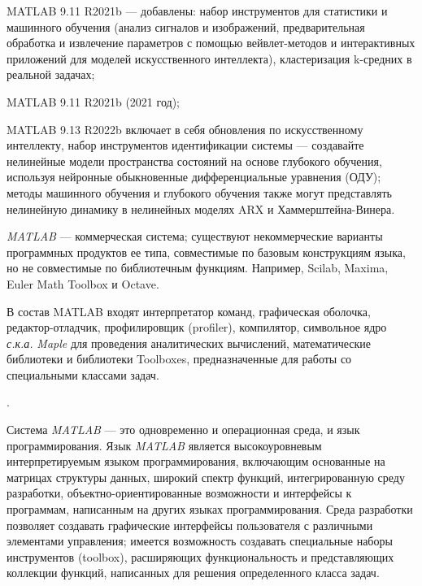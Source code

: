 \begin{textitemize}
	\item MATLAB 9.11 R2021b --- добавлены: набор инструментов для статистики и машинного обучения (анализ сигналов и изображений, предварительная обработка и извлечение параметров с помощью вейвлет-методов и интерактивных приложений для моделей искусственного интеллекта), кластеризация k-средних в реальной задачах; 
	\item MATLAB 9.11 R2021b (2021 год);
	\item MATLAB 9.13 R2022b включает в себя обновления по искусственному интеллекту, набор инструментов идентификации системы --- создавайте нелинейные модели пространства состояний на основе глубокого обучения, используя нейронные обыкновенные дифференциальные уравнения (ОДУ); методы машинного обучения и глубокого обучения также могут представлять нелинейную динамику в нелинейных моделях ARX и Хаммерштейна-Винера.
\end{textitemize}

\textit{MATLAB} --- коммерческая система; существуют некоммерческие варианты программных продуктов ее типа, совместимые по базовым конструкциям языка, но не совместимые по библиотечным функциям. Например, Scilab, Maxima, Euler Math Toolbox и Octave.

В состав MATLAB входят интерпретатор команд, графическая оболочка, редактор-отладчик, профилировщик (profiler), компилятор, символьное ядро \textit{с.к.а.} \textit{Maple} для проведения аналитических вычислений, математические библиотеки и библиотеки Toolboxes, предназначенные для работы со специальными классами задач.

.

Система \textit{MATLAB} --- это одновременно и операционная среда, и язык программирования. Язык \textit{MATLAB} является высокоуровневым интерпретируемым языком программирования, включающим основанные на матрицах структуры данных, широкий спектр функций, интегрированную среду разработки, объектно-ориентированные возможности и интерфейсы к программам, написанным на других языках программирования. Среда разработки позволяет создавать графические интерфейсы пользователя с различными элементами управления; имеется возможность создавать специальные наборы инструментов (toolbox), расширяющих функциональность и представляющих коллекции функций, написанных для решения определенного класса задач.

